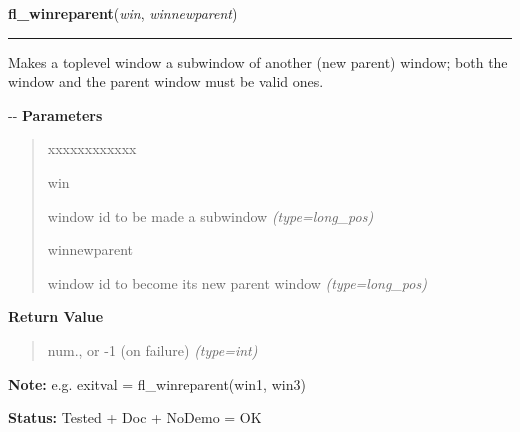 \hspace{.8\funcindent}\begin{boxedminipage}{\funcwidth}

    \raggedright \textbf{fl\_winreparent}(\textit{win}, \textit{winnewparent})

    \vspace{-1.5ex}

    \rule{\textwidth}{0.5\fboxrule}
\setlength{\parskip}{2ex}

Makes a toplevel window a subwindow of another (new parent) window;
both the window and the parent window must be valid ones.

-{}-
\setlength{\parskip}{1ex}
      \textbf{Parameters}
      \vspace{-1ex}

      \begin{quote}
        \begin{Ventry}{xxxxxxxxxxxx}

          \item[win]


window id to be made a subwindow
            {\it (type=long\_pos)}

          \item[winnewparent]


window id to become its new parent window
            {\it (type=long\_pos)}

        \end{Ventry}

      \end{quote}

      \textbf{Return Value}
    \vspace{-1ex}

      \begin{quote}

num., or -1 (on failure)
      {\it (type=int)}

      \end{quote}

\textbf{Note:} 
e.g. exitval = fl\_winreparent(win1, win3)


\textbf{Status:} 
Tested + Doc + NoDemo = OK


    \end{boxedminipage}

    \label{xformslib:flxbasic:fl_winfocus}

    \vspace{0.5ex}

